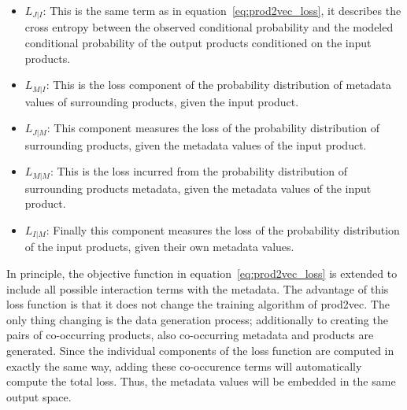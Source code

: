 \begin{itemize}
    \item $L_{J|I}$: This is the same term as in equation~\ref{eq:prod2vec_loss}, it describes the cross entropy between the observed conditional probability and the modeled conditional probability of the output products conditioned on the input products.
    \item $L_{M|I}$: This is the loss component of the probability distribution of metadata values of surrounding products, given the input product.
    \item $L_{J|M}$: This component measures the loss of the probability distribution of surrounding products, given the metadata values of the input product.
    \item $L_{M|M}$: This is the loss incurred from the probability distribution of surrounding products metadata, given the metadata values of the input product.
    \item $L_{I|M}$: Finally this component measures the loss of the probability distribution of the input products, given their own metadata values.
\end{itemize}
In principle, the objective function in equation~\ref{eq:prod2vec_loss} is extended to include all possible interaction terms with the metadata.
The advantage of this loss function is that it does not change the training algorithm of prod2vec.
The only thing changing is the data generation process; additionally to creating the pairs of co-occurring products, also co-occurring metadata and products are generated.
Since the individual components of the loss function are computed in exactly the same way, adding these co-occurence terms will automatically compute the total loss.
Thus, the metadata values will be embedded in the same output space.
